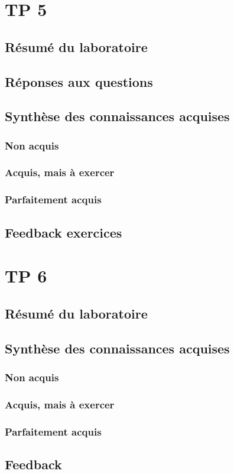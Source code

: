 \documentclass{ReportTemplate}
\begin{document}
\chapter{TP 5}
\section{Résumé du laboratoire}


\section{Réponses aux questions}

\section{Synthèse des connaissances acquises}
\subsection{Non acquis}

\subsection{Acquis, mais à exercer}

\subsection{Parfaitement acquis}

\section{Feedback exercices}


\chapter{TP 6}
\section{Résumé du laboratoire}

\section{Synthèse des connaissances acquises}
\subsection{Non acquis}

\subsection{Acquis, mais à exercer}

\subsection{Parfaitement acquis}

\section{Feedback}
\end{document}
